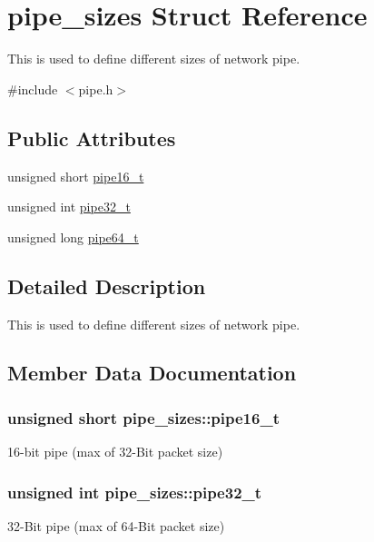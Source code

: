 \hypertarget{structpipe__sizes}{}\section{pipe\+\_\+sizes Struct Reference}
\label{structpipe__sizes}


This is used to define different sizes of network pipe.  




{\ttfamily \#include $<$pipe.\+h$>$}

\subsection*{Public Attributes}
\begin{DoxyCompactItemize}
\item 
unsigned short \hyperlink{structpipe__sizes_ad45fbc171dd7dc906819db3662f01912}{pipe16\+\_\+t}
\item 
unsigned int \hyperlink{structpipe__sizes_a5e62f43829e6cc2027e8ebfcfde43fc2}{pipe32\+\_\+t}
\item 
unsigned long \hyperlink{structpipe__sizes_a442e035eb8f5cbc6a674ca3737bd938f}{pipe64\+\_\+t}
\end{DoxyCompactItemize}


\subsection{Detailed Description}
This is used to define different sizes of network pipe. 

\subsection{Member Data Documentation}
\subsubsection[{pipe16\+\_\+t}]{\setlength{\rightskip}{0pt plus 5cm}unsigned short pipe\+\_\+sizes\+::pipe16\+\_\+t}\hypertarget{structpipe__sizes_ad45fbc171dd7dc906819db3662f01912}{}\label{structpipe__sizes_ad45fbc171dd7dc906819db3662f01912}
16-\/bit pipe (max of 32-\/\+Bit packet size) 
\subsubsection[{pipe32\+\_\+t}]{\setlength{\rightskip}{0pt plus 5cm}unsigned int pipe\+\_\+sizes\+::pipe32\+\_\+t}\hypertarget{structpipe__sizes_a5e62f43829e6cc2027e8ebfcfde43fc2}{}\label{structpipe__sizes_a5e62f43829e6cc2027e8ebfcfde43fc2}
32-\/\+Bit pipe (max of 64-\/\+Bit packet size) 
